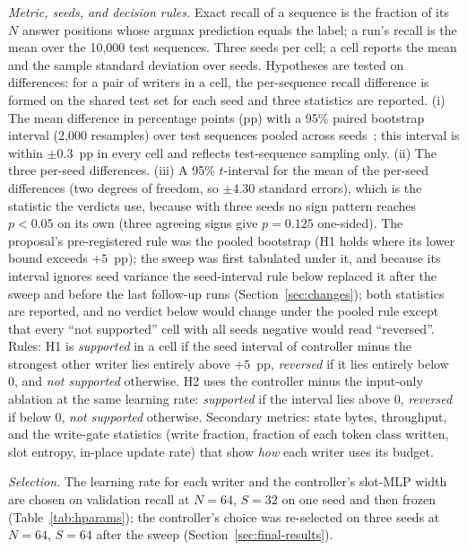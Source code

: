 \documentclass[conference]{IEEEtran}
\begin{document}
\textit{Metric, seeds, and decision rules.} Exact recall of a sequence is the
fraction of its $N$ answer positions whose argmax prediction equals the label;
a run's recall is the mean over the 10{,}000 test sequences. Three seeds per
cell; a cell reports the mean and the sample standard deviation over seeds.
Hypotheses are tested on differences: for a pair of writers in a cell, the
per-sequence recall difference is formed on the shared test set for each seed
and three statistics are reported. (i) The mean difference in percentage
points (pp) with a 95\% paired bootstrap interval (2{,}000 resamples)
over test sequences pooled across seeds~\cite{efron1979bootstrap}; this
interval is within $\pm 0.3$~pp in every cell and reflects test-sequence
sampling only. (ii) The three per-seed differences. (iii) A 95\% $t$-interval
for the mean of the per-seed differences (two degrees of freedom, so
$\pm 4.30$ standard errors), which is the statistic the verdicts use, because
with three seeds no sign pattern reaches $p < 0.05$ on its own (three agreeing
signs give $p = 0.125$ one-sided). The proposal's pre-registered rule was the
pooled bootstrap (H1 holds where its lower bound exceeds $+5$~pp); the sweep
was first tabulated under it, and because its interval ignores seed variance
the seed-interval rule below replaced it after the sweep and before the last
follow-up runs (Section~\ref{sec:changes}); both statistics are reported, and
no verdict below would change under the pooled rule except that every
``not supported'' cell with all seeds negative would read ``reversed''. Rules:
H1 is \emph{supported} in a cell if the seed interval of controller minus the
strongest other writer lies entirely above $+5$~pp, \emph{reversed} if it lies
entirely below 0, and \emph{not supported} otherwise. H2 uses the controller
minus the input-only ablation at the same learning rate: \emph{supported} if
the interval lies above 0, \emph{reversed} if below 0, \emph{not supported}
otherwise. Secondary metrics: state bytes,
throughput, and the write-gate statistics (write fraction, fraction of each
token class written, slot entropy, in-place update rate) that show \emph{how}
each writer uses its budget.

\textit{Selection.} The learning rate for each writer and the controller's
slot-MLP width are chosen on validation recall at $N = 64$, $S = 32$ on one
seed and then frozen (Table~\ref{tab:hparams}); the controller's choice was
re-selected on three seeds at $N = 64$, $S = 64$ after the sweep
(Section~\ref{sec:final-results}).
\end{document}
